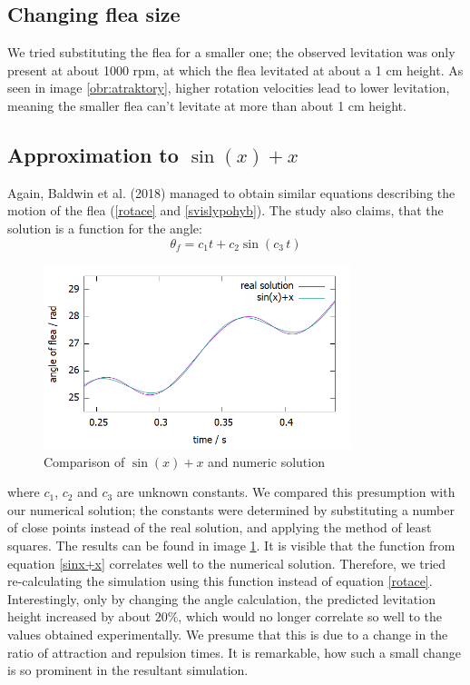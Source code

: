 \documentclass[10pt,a4paper]{article}
\begin{document}
\subsection{Changing flea size}
We tried substituting the flea for a smaller one; the observed levitation was only present at about 1000 rpm, at which the flea levitated at about a 1 cm height. As seen in image \ref{obr:atraktory}, higher rotation velocities lead to lower levitation, meaning the smaller flea can't levitate at more than about 1 cm height. 

\subsection{Approximation to $ \sin(x) + x $}
Again, Baldwin et al. (2018) managed to obtain similar equations describing the motion of the flea (\ref{rotace} and \ref{svislypohyb}). The study also claims, that the solution is a function for the angle:
\begin{equation}
 \theta_f = c_1 t + c_2\sin(c_3 \, t)
\label{sinx+x}
\end{equation}
  
\begin{figure}[H]
  \centering
  \includegraphics[width=0.8\textwidth]{rozdil_my_notingham.png}
  \caption{Comparison of $\sin(x)+x$ and numeric solution}
  \label{obr:sinx+x}
\end{figure}
  
where $c_1$, $c_2$ and $c_3$ are unknown constants. We compared this presumption with our numerical solution; the constants were determined by substituting a number of close points instead of the real solution, and applying the method of least squares. The results can be found in image \ref{obr:sinx+x}. It is visible that the function from equation \ref{sinx+x} correlates well to the numerical solution. Therefore, we tried re-calculating the simulation using this function instead of equation \ref{rotace}. Interestingly, only by changing the angle calculation, the predicted levitation height increased by about $20\%$, which would no longer correlate so well to the values obtained experimentally. We presume that this is due to a change in the ratio of attraction and repulsion times. It is remarkable, how such a small change is so prominent in the resultant simulation.
\end{document}
